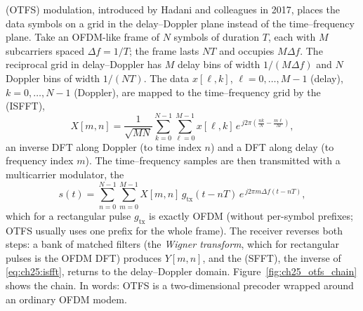  (OTFS) modulation, introduced by Hadani and colleagues in 2017,
places the data symbols on a grid in the delay--Doppler plane instead of the time--frequency plane.
Take an OFDM-like frame of $N$ symbols of duration $T$, each with $M$ subcarriers spaced
$\Delta f=1/T$; the frame lasts $NT$ and occupies $M\Delta f$. The reciprocal grid in delay--Doppler has
$M$ delay bins of width $1/(M\Delta f)$ and $N$ Doppler bins of width $1/(NT)$. The data
$x[\ell,k]$, $\ell=0,\dots,M-1$ (delay), $k=0,\dots,N-1$ (Doppler), are mapped to the time--frequency grid
by the  (ISFFT),
\begin{equation}
X[m,n]=\frac{1}{\sqrt{MN}}\sum_{k=0}^{N-1}\sum_{\ell=0}^{M-1}x[\ell,k]\,
e^{\,j2\pi\left(\frac{nk}{N}-\frac{m\ell}{M}\right)},
\label{eq:ch25:isfft}
\end{equation}
an inverse DFT along Doppler (to time index $n$) and a DFT along delay (to frequency index $m$). The
time--frequency samples are then transmitted with a multicarrier modulator, the 
\begin{equation}
s(t)=\sum_{n=0}^{N-1}\sum_{m=0}^{M-1}X[m,n]\,g_{\text{tx}}(t-nT)\,e^{\,j2\pi m\Delta f(t-nT)},
\label{eq:ch25:heisenberg}
\end{equation}
which for a rectangular pulse $g_{\text{tx}}$ is exactly OFDM (without per-symbol prefixes; OTFS
usually uses one prefix for the whole frame). The receiver reverses both steps: a bank of matched
filters (the \emph{Wigner transform}, which for rectangular pulses is the OFDM DFT) produces
$Y[m,n]$, and the  (SFFT), the inverse of
\eqref{eq:ch25:isfft}, returns to the delay--Doppler domain. Figure~\ref{fig:ch25_otfs_chain} shows the
chain. In words: OTFS is a two-dimensional precoder wrapped around an ordinary OFDM modem.

